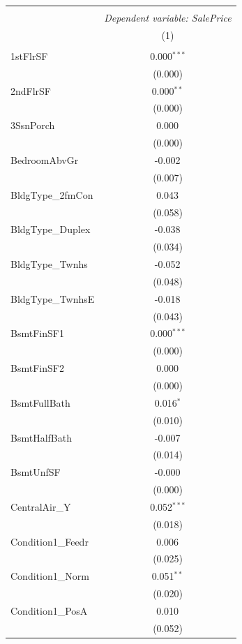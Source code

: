 \begin{table}[!htbp] \centering
\begin{tabular}{@{\extracolsep{5pt}}lc}
\\[-1.8ex]\hline
\hline \\[-1.8ex]
& \multicolumn{1}{c}{\textit{Dependent variable: SalePrice}} \
\cr \cline{2-2}
\\[-1.8ex] & (1) \\
\hline \\[-1.8ex]
 1stFlrSF & 0.000$^{***}$ \\
& (0.000) \\
 2ndFlrSF & 0.000$^{**}$ \\
& (0.000) \\
 3SsnPorch & 0.000$^{}$ \\
& (0.000) \\
 BedroomAbvGr & -0.002$^{}$ \\
& (0.007) \\
 BldgType\_2fmCon & 0.043$^{}$ \\
& (0.058) \\
 BldgType\_Duplex & -0.038$^{}$ \\
& (0.034) \\
 BldgType\_Twnhs & -0.052$^{}$ \\
& (0.048) \\
 BldgType\_TwnhsE & -0.018$^{}$ \\
& (0.043) \\
 BsmtFinSF1 & 0.000$^{***}$ \\
& (0.000) \\
 BsmtFinSF2 & 0.000$^{}$ \\
& (0.000) \\
 BsmtFullBath & 0.016$^{*}$ \\
& (0.010) \\
 BsmtHalfBath & -0.007$^{}$ \\
& (0.014) \\
 BsmtUnfSF & -0.000$^{}$ \\
& (0.000) \\
 CentralAir\_Y & 0.052$^{***}$ \\
& (0.018) \\
 Condition1\_Feedr & 0.006$^{}$ \\
& (0.025) \\
 Condition1\_Norm & 0.051$^{**}$ \\
& (0.020) \\
 Condition1\_PosA & 0.010$^{}$ \\
& (0.052) \\

\end{tabular}
\end{table}
